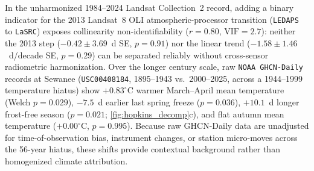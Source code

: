 In the unharmonized 1984--2024 Landsat Collection~2 record, adding a binary indicator for the 2013 Landsat~8 OLI atmospheric-processor transition (\texttt{LEDAPS} to \texttt{LaSRC}) exposes collinearity non-identifiability ($r=0.80$, $\text{VIF}=2.7$): neither the 2013 step ($-0.42 \pm 3.69$~d SE, $p=0.91$) nor the linear trend ($-1.58 \pm 1.46$~d/decade SE, $p=0.29$) can be separated reliably without cross-sensor radiometric harmonization. Over the longer century scale, raw \texttt{NOAA GHCN-Daily} records at Sewanee (\texttt{USC00408184}, 1895--1943 vs.\ 2000--2025, across a 1944--1999 temperature hiatus) show $+0.83^\circ$C warmer March--April mean temperature (Welch $p=0.029$), $-7.5$~d earlier last spring freeze ($p=0.036$), $+10.1$~d longer frost-free season ($p=0.021$; \cref{fig:hopkins_decomp}c), and flat autumn mean temperature ($+0.00^\circ$C, $p=0.995$). Because raw GHCN-Daily data are unadjusted for time-of-observation bias, instrument changes, or station micro-moves across the 56-year hiatus, these shifts provide contextual background rather than homogenized climate attribution.

